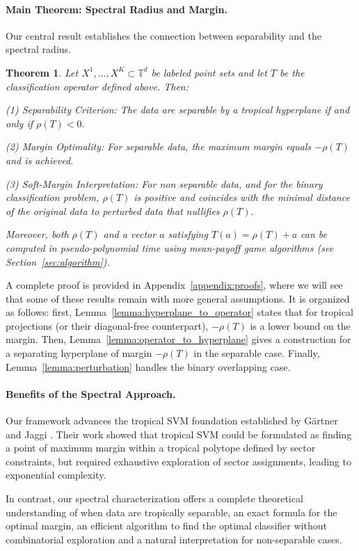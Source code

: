 \documentclass{article}
\newtheorem{theorem}{Theorem}
\newcommand{\trop}{\mathbb{T}}
\begin{document}
\paragraph{Main Theorem: Spectral Radius and Margin.}
Our central result establishes the connection between separability and the spectral radius. 
\begin{theorem}\label{thm:spectral_separability}
Let $X^1,\ldots,X^K \subset \trop^d$ be labeled point sets and let $T$ be the classification operator defined above. Then:

(1) \textit{Separability Criterion:} The data are separable by a tropical hyperplane if and only if $\rho(T) < 0$.

(2) \textit{Margin Optimality:} For separable data, the maximum margin equals $-\rho(T)$ and is achieved.

(3) \textit{Soft-Margin Interpretation:} For non separable data, and for the binary classification problem, $\rho(T)$ is positive and coincides with the minimal distance of the original data to perturbed data that nullifies $\rho(T)$.

Moreover, both $\rho(T)$ and a vector $a$ satisfying $T(a) = \rho(T)+a$ can be computed in pseudo-polynomial time using mean-payoff game algorithms (see Section~\ref{sec:algorithm}).
\end{theorem}
A complete proof is provided in Appendix~\ref{appendix:proofs}, where we will see that some of these results remain with more general assumptions.
It is organized as follows: first, Lemma~\ref{lemma:hyperplane_to_operator} states that for tropical projections (or their diagonal-free counterpart), $-\rho(T)$ is a lower bound on the margin.
Then, Lemma~\ref{lemma:operator_to_hyperplane} gives a construction for a separating hyperplane of margin $-\rho(T)$ in the separable case. Finally, Lemma~\ref{lemma:perturbation} handles the binary overlapping case.

\paragraph{Benefits of the Spectral Approach.} 
Our framework advances the tropical SVM foundation established by Gärtner and Jaggi \cite{gartner2008}. Their work showed that tropical SVM could be formulated as finding a point of maximum margin within a tropical polytope defined by sector constraints, but required exhaustive exploration of sector assignments, leading to exponential complexity.

In contrast, our spectral characterization offers a complete theoretical understanding of when data are tropically separable, an exact formula for the optimal margin, an efficient algorithm to find the optimal classifier without combinatorial exploration and a natural interpretation for non-separable cases.
\end{document}
